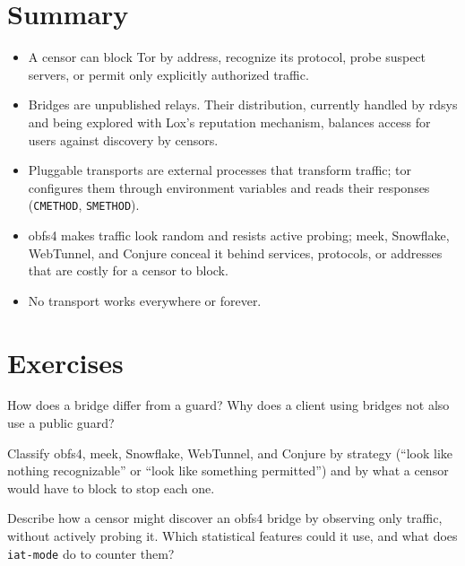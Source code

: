 \section*{Summary}
\begin{itemize}
  \item A censor can block Tor by address, recognize its protocol, probe suspect servers, or permit only explicitly authorized traffic.
  \item Bridges are unpublished relays. Their distribution, currently handled by rdsys and being explored with Lox's reputation mechanism, balances access for users against discovery by censors.
  \item Pluggable transports are external processes that transform traffic; tor configures them through environment variables and reads their responses (\texttt{CMETHOD}, \texttt{SMETHOD}).
  \item obfs4 makes traffic look random and resists active probing; meek, Snowflake, WebTunnel, and Conjure conceal it behind services, protocols, or addresses that are costly for a censor to block.
  \item No transport works everywhere or forever.
\end{itemize}

\section*{Exercises}

\begin{esercizio}[1]\label{es:16-guard}
How does a bridge differ from a guard? Why does a client using bridges not also use a public guard?
\end{esercizio}

\begin{esercizio}[1]\label{es:16-strategie}
Classify obfs4, meek, Snowflake, WebTunnel, and Conjure by strategy (\enquote{look like nothing recognizable} or \enquote{look like something permitted}) and by what a censor would have to block to stop each one.
\end{esercizio}

\begin{esercizio}[2]\label{es:16-sondaggio}
Describe how a censor might discover an obfs4 bridge by observing only traffic, without actively probing it. Which statistical features could it use, and what does \texttt{iat-mode} do to counter them?
\end{esercizio}

